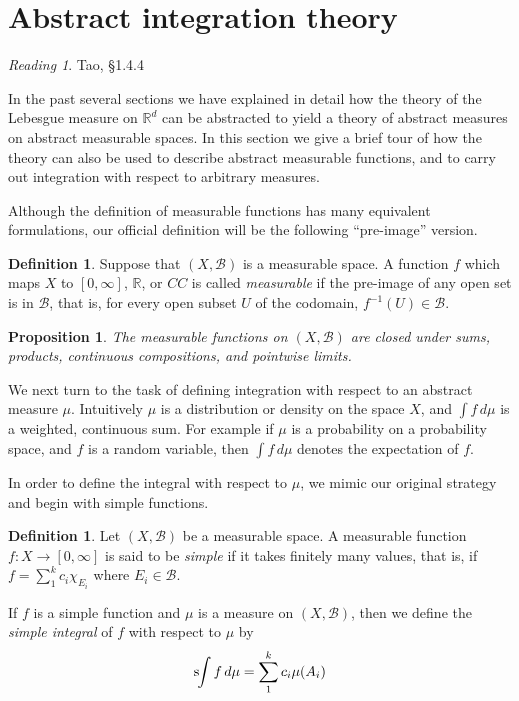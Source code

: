 \documentclass[11pt,oneside]{amsbook}
\newcommand{\RR}{{\mathbb R}}
\newcommand{\sint}{\text{s}\kern-3pt\int}
\theoremstyle{definition}
\theoremstyle{plain}
\newtheorem{prop}[thm]{Proposition}
\theoremstyle{definition}
\newtheorem{defn}[thm]{Definition}
\theoremstyle{remark}
\newtheorem*{reading}{Reading}
\numberwithin{equation}{section}
\numberwithin{figure}{section}
\begin{document}
\section{Abstract integration theory}

\begin{reading}
  Tao, \S 1.4.4
\end{reading}

In the past several sections we have explained in detail how the theory of the Lebesgue measure on $\RR^d$ can be abstracted to yield a theory of abstract measures on abstract measurable spaces. In this section we give a brief tour of how the theory can also be used to describe abstract measurable functions, and to carry out integration with respect to arbitrary measures.

Although the definition of measurable functions has many equivalent formulations, our official definition will be the following ``pre-image'' version.

\begin{defn}
  Suppose that $(X,\mathcal B)$ is a measurable space. A function $f$ which maps $X$ to $[0,\infty]$, $\RR$, or $CC$ is called \emph{measurable} if the pre-image of any open set is in $\mathcal B$, that is, for every open subset $U$ of the codomain, $f^{-1}(U)\in\mathcal B$.
\end{defn}

\begin{prop}
  The measurable functions on $(X,\mathcal B)$ are closed under sums, products, continuous compositions, and pointwise limits.
\end{prop}

We next turn to the task of defining integration with respect to an abstract measure $\mu$. Intuitively $\mu$ is a distribution or density on the space $X$, and $\int f\,d\mu$ is a weighted, continuous sum. For example if $\mu$ is a probability on a probability space, and $f$ is a random variable, then $\int f\,d\mu$ denotes the expectation of $f$.

In order to define the integral with respect to $\mu$, we mimic our original strategy and begin with simple functions.

\begin{defn}
  Let $(X,\mathcal B)$ be a measurable space. A measurable function $f\colon X\to[0,\infty]$ is said to be \emph{simple} if it takes finitely many values, that is, if $f=\sum_1^kc_i\chi_{E_i}$ where $E_i\in\mathcal B$.

  If $f$ is a simple function and $\mu$ is a measure on $(X,\mathcal B)$, then we define the \emph{simple integral} of $f$ with respect to $\mu$ by
  \[\sint f\,d\mu=\sum_1^kc_i\mu(A_i)
  \]
\end{defn}
\end{document}
